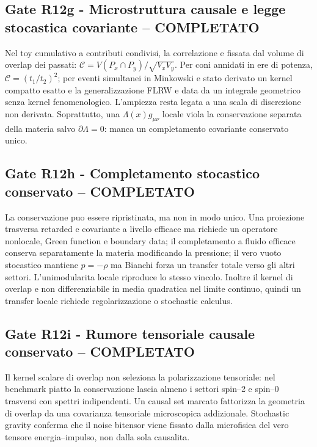 \documentclass[11pt,a4paper]{article}
\begin{document}
\subsection*{Gate R12g - Microstruttura causale e legge stocastica covariante -- COMPLETATO}
Nel toy cumulativo a contributi condivisi, la correlazione e fissata dal volume di overlap dei passati: $\mathcal C=V(P_x\cap P_y)/\sqrt{V_xV_y}$. Per coni annidati in ere di potenza, $\mathcal C=(t_1/t_2)^2$; per eventi simultanei in Minkowski e stato derivato un kernel compatto esatto e la generalizzazione FLRW e data da un integrale geometrico senza kernel fenomenologico. L'ampiezza resta legata a una scala di discrezione non derivata. Soprattutto, una $\Lambda(x)g_{\mu\nu}$ locale viola la conservazione separata della materia salvo $\partial\Lambda=0$: manca un completamento covariante conservato unico.

\subsection*{Gate R12h - Completamento stocastico conservato -- COMPLETATO}
La conservazione puo essere ripristinata, ma non in modo unico. Una proiezione trasversa retarded e covariante a livello efficace ma richiede un operatore nonlocale, Green function e boundary data; il completamento a fluido efficace conserva separatamente la materia modificando la pressione; il vero vuoto stocastico mantiene $p=-\rho$ ma Bianchi forza un transfer totale verso gli altri settori. L'unimodularita locale riproduce lo stesso vincolo. Inoltre il kernel di overlap e non differenziabile in media quadratica nel limite continuo, quindi un transfer locale richiede regolarizzazione o stochastic calculus.

\subsection*{Gate R12i - Rumore tensoriale causale conservato -- COMPLETATO}
Il kernel scalare di overlap non seleziona la polarizzazione tensoriale: nel benchmark piatto la conservazione lascia almeno i settori spin--2 e spin--0 trasversi con spettri indipendenti. Un causal set marcato fattorizza la geometria di overlap da una covarianza tensoriale microscopica addizionale. Stochastic gravity conferma che il noise bitensor viene fissato dalla microfisica del vero tensore energia--impulso, non dalla sola causalita.
\end{document}
